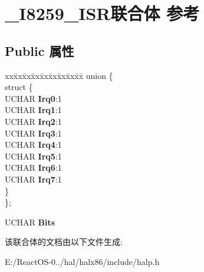 \hypertarget{union___i8259___i_s_r}{}\section{\+\_\+\+I8259\+\_\+\+I\+S\+R联合体 参考}
\label{union___i8259___i_s_r}
\subsection*{Public 属性}
\begin{DoxyCompactItemize}
\item 
\mbox{\label{union___i8259___i_s_r_a609074d516673bae70006cc04a3d1452}} 
\begin{tabbing}
xx\=xx\=xx\=xx\=xx\=xx\=xx\=xx\=xx\=\kill
union \{\\
\mbox{\label{union___i8259___i_s_r_1_1_0D1336_a9051ae4887247e033a73dfdd2102565c}} 
\>struct \{\\
\>\>UCHAR {\bfseries Irq0}:1\\
\>\>UCHAR {\bfseries Irq1}:1\\
\>\>UCHAR {\bfseries Irq2}:1\\
\>\>UCHAR {\bfseries Irq3}:1\\
\>\>UCHAR {\bfseries Irq4}:1\\
\>\>UCHAR {\bfseries Irq5}:1\\
\>\>UCHAR {\bfseries Irq6}:1\\
\>\>UCHAR {\bfseries Irq7}:1\\
\>\} \\
\}; \\

\end{tabbing}\item 
\mbox{\label{union___i8259___i_s_r_abe045072e3305807bea3b1fe14ef2033}} 
U\+C\+H\+AR {\bfseries Bits}
\end{DoxyCompactItemize}


该联合体的文档由以下文件生成\+:\begin{DoxyCompactItemize}
\item 
E\+:/\+React\+O\+S-\/0../hal/halx86/include/halp.\+h\end{DoxyCompactItemize}
